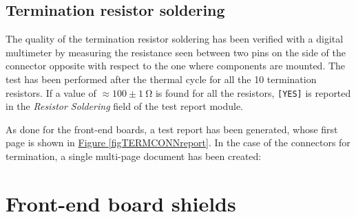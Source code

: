 \subsection{Termination resistor soldering}
The quality of the termination resistor soldering has been verified with a digital multimeter by measuring the resistance seen between two pins on the side of the connector opposite with respect to the one where components are mounted. The test has been performed after the thermal cycle for all the 10 termination resistors. If a value of $\approx100\pm\SI{1}{\ohm}$ is found for all the resistors, \texttt{[YES]} is reported in the \textit{Resistor Soldering} field of the test report module.

\par
As done for the front-end boards, a test report has been generated, whose first page is shown in \hyperref[figTERMCONNreport]{Figure \ref{figTERMCONNreport}}. In the case of the connectors for termination, a single multi-page document has been created:

\begin{table}[ht]
    \centering
    \def\arraystretch{1.3}
    \caption{Structure of the entry for the termination connectors test report.}
    \label{tabTERMCONNstruct}
\end{table}



\section{Front-end board shields} \label{secShield}

